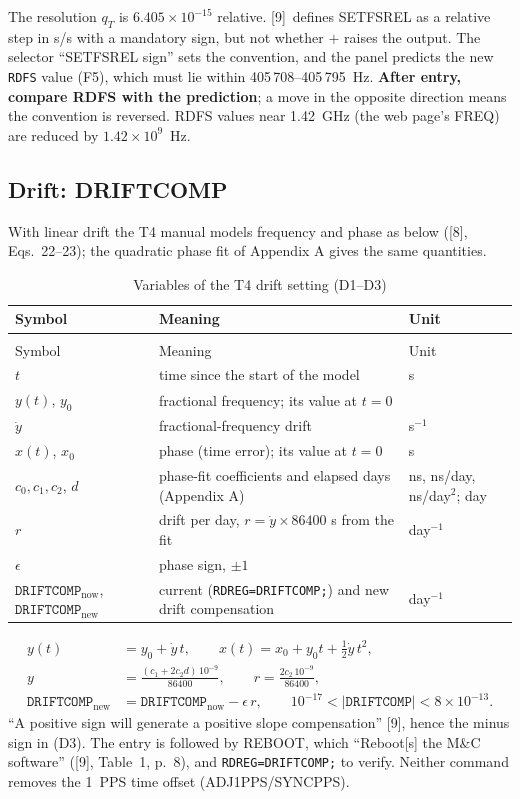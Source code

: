 \documentclass[11pt,a4paper]{article}
\makeatletter
\newcommand{\tfourman}{[8]}
\newcommand{\tfournet}{[9]}
\renewcommand{\_}{\usscore\allowbreak}
\newenvironment{vartable}[2]{%
 \par\small\setlength{\LTpre}{3pt}\setlength{\LTpost}{3pt}%
 \begin{longtable}{@{}>{\raggedright}p{.2\linewidth}>{\raggedright}p{.57\linewidth}>{\raggedright\arraybackslash}p{.17\linewidth}@{}}
 \caption{#2}\label{#1}\\
 \toprule Symbol & Meaning & Unit\\\midrule
 \endfirsthead
 \multicolumn{3}{@{}l}{\footnotesize\itshape Table \thetable{} (continued)}\\
 \toprule Symbol & Meaning & Unit\\\midrule
 \endhead
 \bottomrule
 \endlastfoot}
 {\end{longtable}\normalsize}
\makeatother
\begin{document}
The resolution \(q_T\) is \(6.405\times10^{-15}\) relative.
\tfournet\ defines SETFSREL as a relative step in s/s with a mandatory sign, but not whether $+$
raises the output. The selector ``SETFSREL sign'' sets the convention, and the panel predicts the new
\texttt{RDFS} value (F5), which must lie within 405\,708--405\,795~Hz. \textbf{After entry, compare
RDFS with the prediction}; a move in the opposite direction means the convention is
reversed. RDFS values near 1.42~GHz (the web page's FREQ) are reduced by $1.42\times10^9$~Hz.

\subsection{Drift: DRIFTCOMP}
With linear drift the T4 manual models frequency and phase as below (\tfourman, Eqs.~22--23); the
quadratic phase fit of Appendix A gives the same quantities.
\begin{vartable}{tab:var-D}{Variables of the T4 drift setting (D1--D3)}
\(t\) & time since the start of the model & s\\
\(y(t)\), \(y_0\) & fractional frequency; its value at \(t=0\) & 1\\
\(\dot y\) & fractional-frequency drift & s\(^{-1}\)\\
\(x(t)\), \(x_0\) & phase (time error); its value at \(t=0\) & s\\
\(c_0,c_1,c_2\), \(d\) & phase-fit coefficients and elapsed days (Appendix A) & ns, ns/day, ns/day\(^2\); day\\
\(r\) & drift per day, \(r=\dot y\times86400\) s from the fit & day\(^{-1}\)\\
\(\epsilon\) & phase sign, \(\pm1\) & 1\\
\(\mathtt{DRIFTCOMP}_{\mathrm{now}}\), \(\mathtt{DRIFTCOMP}_{\mathrm{new}}\) & current (\texttt{RDREG=DRIFTCOMP;}) and new drift compensation & day\(^{-1}\)\\
\end{vartable}
\begin{align}
y(t)&=y_0+\dot y\,t,\qquad x(t)=x_0+y_0t+\tfrac12\dot y\,t^2, \tag{D1}\label{eq:D1}\\
y&=\frac{(c_1+2c_2d)\,10^{-9}}{86400},\qquad r=\frac{2c_2\,10^{-9}}{86400}, \tag{D2}\label{eq:D2}\\
\mathtt{DRIFTCOMP}_{\mathrm{new}}&=\mathtt{DRIFTCOMP}_{\mathrm{now}}-\epsilon\,r,
\qquad 10^{-17}<|\mathtt{DRIFTCOMP}|<8\times10^{-13}. \tag{D3}\label{eq:D3}
\end{align}
``A positive sign will generate a positive slope compensation'' \tfournet, hence the minus sign in
(D3). The entry is followed by REBOOT, which ``Reboot[s] the M\&C software'' (\tfournet, Table~1,
p.~8), and \texttt{RDREG=DRIFTCOMP;} to verify. Neither command removes the 1~PPS time offset
(ADJ1PPS/SYNCPPS).
\end{document}
